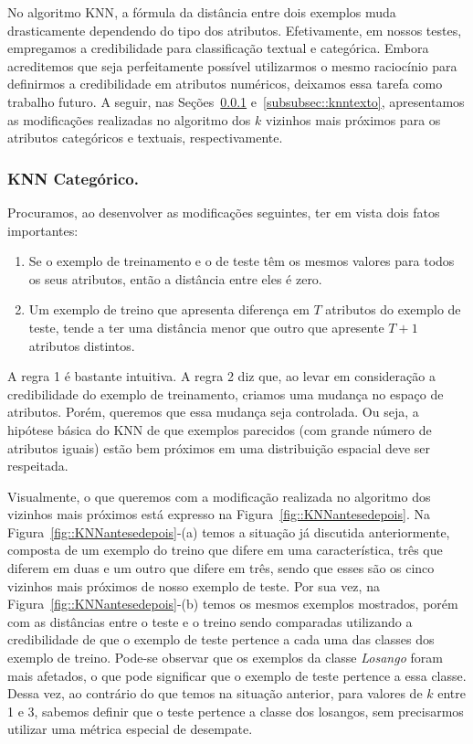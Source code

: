 No algoritmo \textsc{KNN}, a fórmula da distância entre dois exemplos muda drasticamente dependendo do tipo dos atributos.
Efetivamente, em nossos testes, empregamos a credibilidade para classificação textual e categórica. Embora acreditemos que seja perfeitamente possível utilizarmos o mesmo raciocínio para definirmos a credibilidade em atributos numéricos, deixamos essa tarefa como trabalho futuro. A seguir, nas Seções~\ref{subsubsec::knncat} e~\ref{subsubsec::knntexto}, apresentamos as modificações realizadas no algoritmo dos $k$ vizinhos mais próximos para os atributos categóricos e textuais, respectivamente.

\subsubsection{\textsc{KNN} Categórico.}
\label{subsubsec::knncat}

Procuramos, ao desenvolver as modificações seguintes, ter em vista dois fatos importantes:
\begin{enumerate}
\item Se o exemplo de treinamento e o de teste têm os mesmos valores para todos os seus atributos, então a distância entre eles é zero.
\item Um exemplo de treino que apresenta diferença em $T$ atributos do exemplo de teste, tende a ter uma distância menor que outro que apresente $T+1$ atributos distintos.
\end{enumerate}

A regra 1 é bastante intuitiva. A regra 2 diz que, ao levar em consideração a credibilidade do exemplo de treinamento, criamos uma mudança no espaço de atributos. Porém, queremos que essa mudança seja controlada. Ou seja, a hipótese básica do \textsc{KNN} de que exemplos parecidos (com grande número de atributos iguais) estão bem próximos em uma distribuição espacial deve ser respeitada.

Visualmente, o que queremos com a modificação realizada no algoritmo dos vizinhos mais próximos está expresso na Figura~\ref{fig::KNNantesedepois}. Na Figura~\ref{fig::KNNantesedepois}-(a) temos a situação já discutida anteriormente, composta de um exemplo do treino que difere em uma característica, três que diferem em duas e um outro que difere em três, sendo que esses são os cinco vizinhos mais próximos de nosso exemplo de teste. Por sua vez, na Figura~\ref{fig::KNNantesedepois}-(b) temos os mesmos exemplos mostrados, porém com as distâncias entre o teste e o treino sendo comparadas utilizando a credibilidade de que o exemplo de teste pertence a cada uma das classes dos exemplo de treino.
Pode-se observar que os exemplos da classe \textit{Losango} foram mais afetados, o que pode significar que o exemplo de teste pertence a essa classe. Dessa vez, ao contrário do que temos na situação anterior, para valores de $k$ entre 1 e 3, sabemos definir que o teste pertence a classe dos losangos, sem precisarmos utilizar uma métrica especial de desempate.

